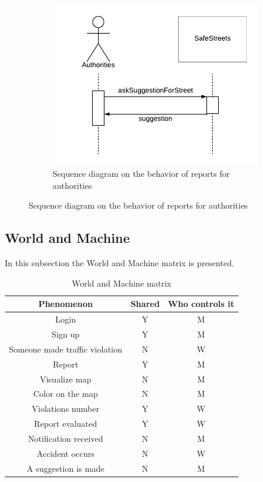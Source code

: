 \documentclass[12pt,a4paper]{report}
\begin{document}
			\begin{figure}[H]
				\begin{subfigure}{\textwidth}
					\includegraphics[scale = 0.75, center]{SuggestionSequenceDiagram}
					\caption{Sequence diagram on the behavior of reports for authorities}
				\end{subfigure}
			\end{figure}

	\subsection{World and Machine}
		In this subsection the World and Machine matrix is presented.
		\begin{table}[H]
			\centering
			\begin{tabular}{|c|c|c|}
				\hline
				Phenomenon & Shared & Who controls it\\
				\hline
				\hline
				Login & Y & M\\
				\hline
				Sign up & Y & M\\
				\hline
				Someone made traffic violation & N & W\\
				\hline
				Report & Y & M\\
				\hline
				Visualize map & N & M\\
				\hline
				Color on the map & N & M\\
				\hline
				Violations number & Y & W\\
				\hline
				Report evaluated & Y & W\\
				\hline
				Notification received & N & M\\
				\hline
				Accident occurs & N & W\\
				\hline
				A suggestion is made & N & M\\
				\hline
				
				
			\end{tabular}
			\caption{World and Machine matrix}
			\label{tab: }
		\end{table}
	
\end{document}

